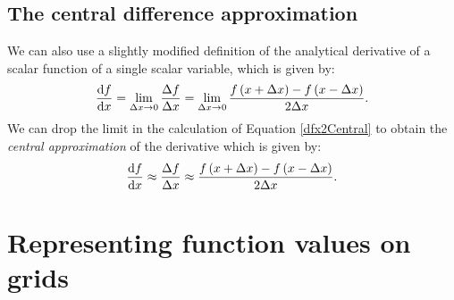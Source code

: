 \documentclass[12pt,letter]{article}
\begin{document}
\subsection{The central difference approximation} 
We can also use a slightly modified definition of the analytical derivative of a scalar function of a single scalar variable, which is given by: 
\begin{align}
        \dv{f}{x} = \lim_{\Delta x \rightarrow 0}\frac{\Delta f}{\Delta x} = \lim_{\Delta x \rightarrow 0}\frac{f\left(x+\Delta x\right) - f\left(x-\Delta x\right)}{2\Delta x}.
	\label{dfx2Central}
\end{align}
We can drop the limit in the calculation of Equation \ref{dfx2Central} to obtain the {\em central approximation} of the derivative which is given by:    
\begin{align}
        \dv{f}{x} \approx \frac{\Delta f}{\Delta x} \approx \frac{f\left(x+\Delta x\right) - f\left(x-\Delta x\right)}{2\Delta x}. 
	\label{dfx2CentralApprox}
\end{align}

\section{Representing function values on grids}
\end{document}
